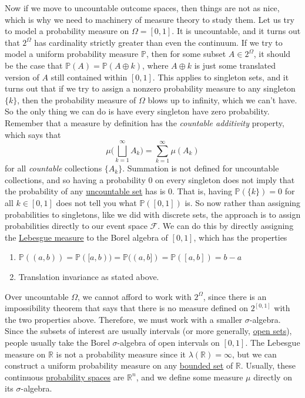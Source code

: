   Now if we move to uncountable outcome spaces, then things are not as nice, which is why we need to machinery of measure theory to study them. Let us try to model a probability measure on $\Omega = [0, 1]$. It is uncountable, and it turns out that $2^\Omega$ has cardinality strictly greater than even the continuum. If we try to model a uniform probability measure $\mathbb{P}$, then for some subset $A \in 2^\Omega$, it should be the case that $\mathbb{P}(A) = \mathbb{P}(A \oplus k)$, where $A \oplus k$ is just some translated version of $A$ still contained within $[0, 1]$. This applies to singleton sets, and it turns out that if we try to assign a nonzero probability measure to any singleton $\{k\}$, then the probability measure of $\Omega$ blows up to infinity, which we can't have. So the only thing we can do is have every singleton have zero probability. Remember that a measure by definition has the \textit{countable additivity} property, which says that 
  \begin{equation}
    \mu \bigg( \bigsqcup_{k=1}^\infty A_k \bigg) = \sum_{k=1}^\infty \mu(A_k)
  \end{equation}
  for all \textit{countable} collections $\{A_k\}$. Summation is not defined for uncountable collections, and so having a probability $0$ on every singleton does not imply that the probability of any \hyperref[st-def:uncountable-set]{uncountable set} has is $0$. That is, having $\mathbb{P}(\{k\}) = 0$ for all $k \in [0, 1]$ does not tell you what $\mathbb{P}([0, 1])$ is. So now rather than assigning probabilities to singletons, like we did with discrete sets, the approach is to assign probabilities directly to our event space $\mathcal{F}$. We can do this by directly assigning the \hyperref[mt-def:lebesgue-measure]{Lebesgue measure} to the Borel algebra of $[0, 1]$, which has the properties 
  \begin{enumerate}
    \item $\mathbb{P}((a, b)) = \mathbb{P}([a, b)) = \mathbb{P}((a, b]) = \mathbb{P}([a, b]) = b - a$
    \item Translation invariance as stated above. 
  \end{enumerate}
  Over uncountable $\Omega$, we cannot afford to work with $2^\Omega$, since there is an impossibility theorem that says that there is no measure defined on $2^{[0, 1]}$ with the two properties above. Therefore, we must work with a smaller $\sigma$-algebra. Since the subsets of interest are usually intervals (or more generally, \hyperref[pst-def:open-set]{open sets}), people usually take the Borel $\sigma$-algebra of open intervals on $[0, 1]$. The Lebesgue measure on $\mathbb{R}$ is not a probability measure since it $\lambda(\mathbb{R}) = \infty$, but we can construct a uniform probability measure on any \hyperref[pst-def:bounded-set]{bounded set} of $\mathbb{R}$. Usually, these continuous \hyperref[def:probability-space]{probability spaces} are $\mathbb{R}^n$, and we define some measure $\mu$ directly on its $\sigma$-algebra. 

